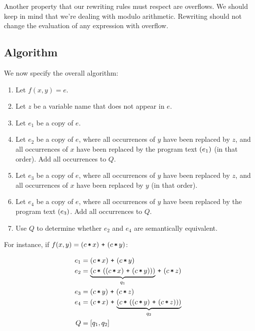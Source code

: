Another property that our rewriting rules must respect are overflows. We should
keep in mind that we're dealing with modulo arithmetic. Rewriting should not
change the evaluation of any expression with overflow.

\subsection{Algorithm}

We now specify the overall algorithm:

\begin{enumerate}

\item Let $f(x,y)=e$.

\item Let $z$ be a variable name that does not appear in $e$.

\item Let $e_1$ be a copy of $e$.

\item Let $e_2$ be a copy of $e$, where all occurrences of $y$ have been
replaced by $z$, and all occurrences of $x$ have been replaced by the program
text $\left({e_1}\right)$ (in that order). Add all occurrences to $Q$.

\item Let $e_3$ be a copy of $e$, where all occurrences of $y$ have been
replaced by $z$, and all occurrences of $x$ have been replaced by $y$ (in that
order).

\item Let $e_4$ be a copy of $e$, where all occurrences of $y$ have been
replaced by the program text $\left({e_3}\right)$. Add all occurrences to $Q$.

\item Use $Q$ to determine whether $e_2$ and $e_4$ are semantically equivalent.

\end{enumerate}

For instance, if $f(x,y)=\p{c\lt x} \lp \p{c\lt y}$:

\begin{align*}
e_1 &= \p{c\lt x} \lp \p{c\lt y} \\
e_2 &= \underbrace{\p{c \lt \p{\p{c\lt x} \lp \p{c\lt y}}}}_{q_1} \lp \p{c \lt
z} \\
e_3 &= \p{c\lt y} \lp \p{c \lt z} \\
e_4 &= \p{c \lt x} \lp \underbrace{\p{c \lt \p{ \p{c \lt y} \lp \p{c \lt z}
}}}_{q_2} \\
Q &= \seq{q_1, q_2 }
\end{align*}


